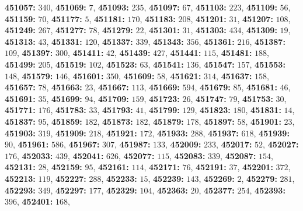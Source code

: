 \textsf{\bfseries 451057:} $340$, \textsf{\bfseries 451069:} $7$, \textsf{\bfseries 451093:} $235$, \textsf{\bfseries 451097:} $67$, \textsf{\bfseries 451103:} $223$, \textsf{\bfseries 451109:} $56$, \textsf{\bfseries 451159:} $70$, \textsf{\bfseries 451177:} $5$, \textsf{\bfseries 451181:} $170$, \textsf{\bfseries 451183:} $208$, \textsf{\bfseries 451201:} $31$, \textsf{\bfseries 451207:} $108$, \textsf{\bfseries 451249:} $267$, \textsf{\bfseries 451277:} $78$, \textsf{\bfseries 451279:} $22$, \textsf{\bfseries 451301:} $31$, \textsf{\bfseries 451303:} $434$, \textsf{\bfseries 451309:} $19$, \textsf{\bfseries 451313:} $43$, \textsf{\bfseries 451331:} $120$, \textsf{\bfseries 451337:} $339$, \textsf{\bfseries 451343:} $356$, \textsf{\bfseries 451361:} $216$, \textsf{\bfseries 451387:} $109$, \textsf{\bfseries 451397:} $300$, \textsf{\bfseries 451411:} $42$, \textsf{\bfseries 451439:} $427$, \textsf{\bfseries 451441:} $115$, \textsf{\bfseries 451481:} $188$, \textsf{\bfseries 451499:} $205$, \textsf{\bfseries 451519:} $102$, \textsf{\bfseries 451523:} $63$, \textsf{\bfseries 451541:} $136$, \textsf{\bfseries 451547:} $157$, \textsf{\bfseries 451553:} $148$, \textsf{\bfseries 451579:} $146$, \textsf{\bfseries 451601:} $350$, \textsf{\bfseries 451609:} $58$, \textsf{\bfseries 451621:} $314$, \textsf{\bfseries 451637:} $158$, \textsf{\bfseries 451657:} $78$, \textsf{\bfseries 451663:} $23$, \textsf{\bfseries 451667:} $113$, \textsf{\bfseries 451669:} $594$, \textsf{\bfseries 451679:} $85$, \textsf{\bfseries 451681:} $46$, \textsf{\bfseries 451691:} $35$, \textsf{\bfseries 451699:} $94$, \textsf{\bfseries 451709:} $159$, \textsf{\bfseries 451723:} $26$, \textsf{\bfseries 451747:} $79$, \textsf{\bfseries 451753:} $30$, \textsf{\bfseries 451771:} $176$, \textsf{\bfseries 451783:} $33$, \textsf{\bfseries 451793:} $41$, \textsf{\bfseries 451799:} $129$, \textsf{\bfseries 451823:} $180$, \textsf{\bfseries 451831:} $14$, \textsf{\bfseries 451837:} $95$, \textsf{\bfseries 451859:} $182$, \textsf{\bfseries 451873:} $182$, \textsf{\bfseries 451879:} $178$, \textsf{\bfseries 451897:} $58$, \textsf{\bfseries 451901:} $23$, \textsf{\bfseries 451903:} $319$, \textsf{\bfseries 451909:} $218$, \textsf{\bfseries 451921:} $172$, \textsf{\bfseries 451933:} $288$, \textsf{\bfseries 451937:} $618$, \textsf{\bfseries 451939:} $90$, \textsf{\bfseries 451961:} $586$, \textsf{\bfseries 451967:} $307$, \textsf{\bfseries 451987:} $133$, \textsf{\bfseries 452009:} $233$, \textsf{\bfseries 452017:} $52$, \textsf{\bfseries 452027:} $176$, \textsf{\bfseries 452033:} $439$, \textsf{\bfseries 452041:} $626$, \textsf{\bfseries 452077:} $115$, \textsf{\bfseries 452083:} $339$, \textsf{\bfseries 452087:} $154$, \textsf{\bfseries 452131:} $28$, \textsf{\bfseries 452159:} $95$, \textsf{\bfseries 452161:} $114$, \textsf{\bfseries 452171:} $76$, \textsf{\bfseries 452191:} $37$, \textsf{\bfseries 452201:} $372$, \textsf{\bfseries 452213:} $119$, \textsf{\bfseries 452227:} $288$, \textsf{\bfseries 452233:} $15$, \textsf{\bfseries 452239:} $143$, \textsf{\bfseries 452269:} $2$, \textsf{\bfseries 452279:} $281$, \textsf{\bfseries 452293:} $349$, \textsf{\bfseries 452297:} $177$, \textsf{\bfseries 452329:} $104$, \textsf{\bfseries 452363:} $20$, \textsf{\bfseries 452377:} $254$, \textsf{\bfseries 452393:} $396$, \textsf{\bfseries 452401:} $168$, 
